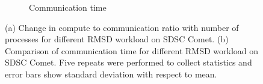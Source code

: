 \begin{figure}[ht!]
\begin{subfigure}{.4\textwidth}
  \caption{Communication time}
  \label{fig:MPItottime-chain-reader}
\end{subfigure}
\caption{(a) Change in compute to communication ratio with number of processes for different RMSD workload on SDSC Comet. 
(b) Comparison of communication time for different RMSD workload on SDSC Comet.
Five repeats were performed to collect statistics and error bars show standard deviation with respect to mean.}
\label{fig:tcom_tcomm_effect}
\end{figure}

